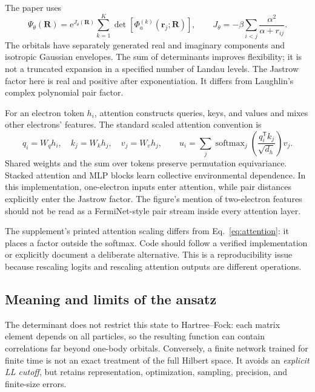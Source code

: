 \documentclass[11pt,letterpaper]{article}
\newcommand{\R}{\mathbf R}
\newcommand{\rr}{\mathbf r}
\newcommand{\ee}{\mathrm e}
\begin{document}
The paper uses
\begin{equation}
 \Psi_\theta(\R)=\ee^{J_\theta(\R)}
 \sum_{k=1}^{K}\det\left[\Phi^{(k)}_{a}(\rr_j;\R)\right],\qquad
 J_\theta=-\beta\sum_{i<j}\frac{\alpha^2}{\alpha+r_{ij}}.
 \label{eq:ansatz}
\end{equation}
The orbitals have separately generated real and imaginary components and isotropic Gaussian envelopes. The sum of determinants improves flexibility; it is not a truncated expansion in a specified number of Landau levels. The Jastrow factor here is real and positive after exponentiation. It differs from Laughlin's complex polynomial pair factor.

For an electron token $h_i$, attention constructs queries, keys, and values and mixes other electrons' features. The standard scaled attention convention is
\begin{equation}
 q_i=W_qh_i,\quad k_j=W_kh_j,\quad v_j=W_vh_j,\qquad
 u_i=\sum_j\operatorname{softmax}_j\left(\frac{q_i^\mathsf T k_j}{\sqrt{d_h}}\right)v_j.
 \label{eq:attention}
\end{equation}
Shared weights and the sum over tokens preserve permutation equivariance. Stacked attention and MLP blocks learn collective environmental dependence. In this implementation, one-electron inputs enter attention, while pair distances explicitly enter the Jastrow factor. The figure's mention of two-electron features should not be read as a FermiNet-style pair stream inside every attention layer.\cite{psiformer}

The supplement's printed attention scaling differs from Eq.~\eqref{eq:attention}: it places a factor outside the softmax. Code should follow a verified implementation or explicitly document a deliberate alternative. This is a reproducibility issue because rescaling logits and rescaling attention outputs are different operations.

\subsection{Meaning and limits of the ansatz}

The determinant does not restrict this state to Hartree--Fock: each matrix element depends on all particles, so the resulting function can contain correlations far beyond one-body orbitals. Conversely, a finite network trained for finite time is not an exact treatment of the full Hilbert space. It avoids an \emph{explicit LL cutoff}, but retains representation, optimization, sampling, precision, and finite-size errors.
\end{document}
